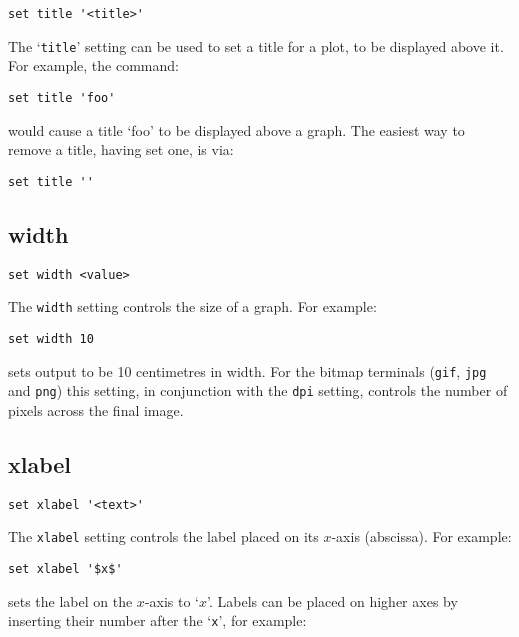 \begin{verbatim}
set title '<title>'
\end{verbatim}

The `{\tt title}' setting can be used to set a title for a plot, to be displayed
above it.  For example, the command:

\begin{verbatim}
set title 'foo'
\end{verbatim}

\noindent would cause a title `foo' to be displayed above a graph. The easiest
way to remove a title, having set one, is via:

\begin{verbatim}
set title ''
\end{verbatim}
   
\subsection{width}

\begin{verbatim}
set width <value>
\end{verbatim}

The {\tt width} setting controls the size of a graph.  For example:

\begin{verbatim}
set width 10
\end{verbatim}

\noindent sets output to be 10 centimetres in width.  For the bitmap terminals ({\tt gif},
{\tt jpg} and {\tt png}) this setting, in conjunction with the {\tt dpi}
setting, controls the number of pixels across the final image.

\subsection{xlabel}

\begin{verbatim}
set xlabel '<text>'
\end{verbatim}

The {\tt xlabel} setting controls the label placed on its $x$-axis (abscissa).
For example:

\begin{verbatim}
set xlabel '$x$'
\end{verbatim}

\noindent sets the label on the $x$-axis to `$x$'.  Labels can be placed on higher axes by
inserting their number after the `\texttt{x}', for example:

